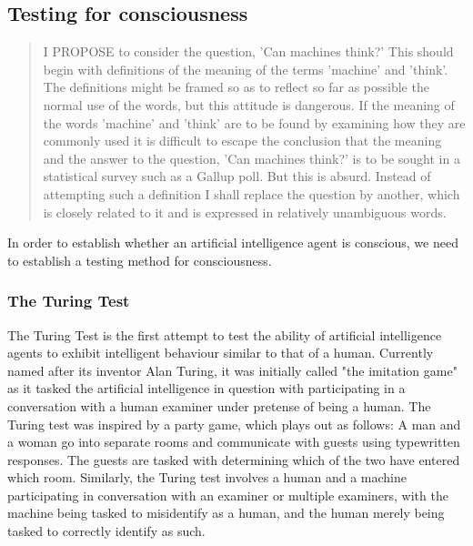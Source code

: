 \documentclass[masterthesis]{fer}
\begin{document}
\subsection{Testing for consciousness}
\begin{quote}
I PROPOSE to consider the question, 'Can machines think?' This should begin with definitions of the meaning of the terms 'machine' and 'think'. The definitions might be framed so as to reflect so far as possible the normal use of the words, but this attitude is dangerous. If the meaning of the words 'machine' and 'think' are to be found by examining how they are commonly used it is difficult to escape the conclusion that the meaning and the answer to the question, 'Can machines think?' is to be sought in a statistical survey such as a Gallup poll. But this is absurd. Instead of attempting such a definition I shall replace the question by another, which is closely related to it and is expressed in relatively unambiguous words. 
\cite{turing1}
\end{quote}
In order to establish whether an artificial intelligence agent is conscious, we need to establish a testing method for consciousness.

\subsubsection{The Turing Test}
The Turing Test is the first attempt to test the ability of artificial intelligence agents to exhibit intelligent behaviour similar to that of a human.
Currently named after its inventor Alan Turing, it was initially called "the imitation game" as it tasked the artificial intelligence in question with participating in a conversation with a human examiner under pretense of being a human.
The Turing test was inspired by a party game, which plays out as follows: A man and a woman go into separate rooms and communicate with guests using typewritten responses. The guests are tasked with determining which of the two have entered which room.
Similarly, the Turing test involves a human and a machine participating in conversation with an examiner or multiple examiners, with the machine being tasked to misidentify as a human, and the human merely being tasked to correctly identify as such.
\end{document}
